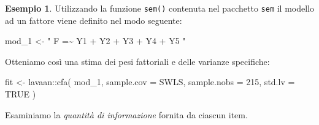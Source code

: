 \documentclass[
  11pt,
]{krantz}
\makeatletter
\newenvironment{Shaded}{\begin{snugshade}}{\end{snugshade}}
\newcommand{\AttributeTok}[1]{\textcolor[rgb]{0.61,0.61,0.61}{#1}}
\newcommand{\CommentTok}[1]{\textcolor[rgb]{0.37,0.37,0.37}{\textit{#1}}}
\newcommand{\ConstantTok}[1]{\textcolor[rgb]{0,0,0}{#1}}
\newcommand{\DecValTok}[1]{\textcolor[rgb]{0.06,0.06,0.06}{#1}}
\newcommand{\FunctionTok}[1]{\textcolor[rgb]{0,0,0}{#1}}
\newcommand{\NormalTok}[1]{#1}
\newcommand{\OtherTok}[1]{\textcolor[rgb]{0.37,0.37,0.37}{#1}}
\newcommand{\SpecialCharTok}[1]{\textcolor[rgb]{0,0,0}{#1}}
\newcommand{\StringTok}[1]{\textcolor[rgb]{0.5,0.5,0.5}{#1}}
\newenvironment{kframe}{%
\medskip{}
\setlength{\fboxsep}{.8em}
 \def\at@end@of@kframe{}%
 \ifinner\ifhmode%
  \def\at@end@of@kframe{\end{minipage}}%
  \begin{minipage}{\columnwidth}%
 \fi\fi%
 \def\FrameCommand##1{\hskip\@totalleftmargin \hskip-\fboxsep
 \colorbox{shadecolor}{##1}\hskip-\fboxsep
     \hskip-\linewidth \hskip-\@totalleftmargin \hskip\columnwidth}%
 \MakeFramed {\advance\hsize-\width
   \@totalleftmargin\z@ \linewidth\hsize
   \@setminipage}}%
 {\par\unskip\endMakeFramed%
 \at@end@of@kframe}
\renewenvironment{Shaded}{\begin{kframe}}{\end{kframe}}
\theoremstyle{definition}
\theoremstyle{definition}
\newtheorem{example}{Esempio}[chapter]
\theoremstyle{definition}
\theoremstyle{definition}
\theoremstyle{remark}
\makeatother
\begin{document}
\begin{example}
Utilizzando la funzione \texttt{sem()} contenuta nel pacchetto \texttt{sem} il modello ad un fattore viene definito nel modo seguente:

\begin{Shaded}
\begin{Highlighting}[]
\NormalTok{mod\_1 }\OtherTok{\textless{}{-}} \StringTok{"}
\StringTok{  F =\textasciitilde{} Y1 + Y2 + Y3 + Y4 + Y5}
\StringTok{"}
\end{Highlighting}
\end{Shaded}

Otteniamo così una stima dei pesi fattoriali e delle varianze specifiche:

\begin{Shaded}
\begin{Highlighting}[]
\NormalTok{fit }\OtherTok{\textless{}{-}}\NormalTok{ lavaan}\SpecialCharTok{::}\FunctionTok{cfa}\NormalTok{(}
\NormalTok{  mod\_1,}
  \AttributeTok{sample.cov =}\NormalTok{ SWLS,}
  \AttributeTok{sample.nobs =} \DecValTok{215}\NormalTok{,}
  \AttributeTok{std.lv =} \ConstantTok{TRUE}
\NormalTok{)}
\end{Highlighting}
\end{Shaded}

Esaminiamo la \emph{quantità di informazione} fornita da ciascun item.

\begin{Shaded}
\end{Shaded}

\begin{Shaded}
\end{Shaded}


\end{example}
\end{document}
